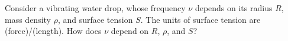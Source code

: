Consider a vibrating water drop, whose frequency $\nu$ depends on its radius $R$, mass density $\rho$, and surface tension $S$. The units of surface tension are (force)/(length). How does $\nu$ depend on $R$, $\rho$, and $S$?